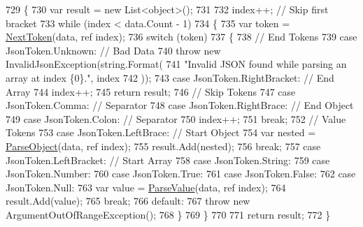 \begin{DoxyCode}
729         \{
730             var result = \textcolor{keyword}{new} List<object>();
731 
732             index++; \textcolor{comment}{// Skip first bracket}
733             \textcolor{keywordflow}{while} (index < data.Count - 1)
734             \{
735                 var token = \hyperlink{a00046_a1d2daab9b052b186da7a2b6711be5803}{NextToken}(data, ref index);
736                 \textcolor{keywordflow}{switch} (token)
737                 \{
738                     \textcolor{comment}{// End Tokens}
739                     \textcolor{keywordflow}{case} JsonToken.Unknown:             \textcolor{comment}{// Bad Data}
740                         \textcolor{keywordflow}{throw} \textcolor{keyword}{new} InvalidJsonException(\textcolor{keywordtype}{string}.Format(
741                             \textcolor{stringliteral}{"Invalid JSON found while parsing an array at index \{0\}."}, index
742                             ));
743                     \textcolor{keywordflow}{case} JsonToken.RightBracket:        \textcolor{comment}{// End Array}
744                         index++;
745                         \textcolor{keywordflow}{return} result;
746                     \textcolor{comment}{// Skip Tokens}
747                     \textcolor{keywordflow}{case} JsonToken.Comma:               \textcolor{comment}{// Separator}
748                     \textcolor{keywordflow}{case} JsonToken.RightBrace:          \textcolor{comment}{// End Object}
749                     \textcolor{keywordflow}{case} JsonToken.Colon:               \textcolor{comment}{// Separator}
750                         index++;
751                         \textcolor{keywordflow}{break};
752                     \textcolor{comment}{// Value Tokens}
753                     \textcolor{keywordflow}{case} JsonToken.LeftBrace:           \textcolor{comment}{// Start Object}
754                         var nested = \hyperlink{a00046_a49577a43cf31e147b6d46ea28f7f617e}{ParseObject}(data, ref index);
755                         result.Add(nested);
756                         \textcolor{keywordflow}{break};
757                     \textcolor{keywordflow}{case} JsonToken.LeftBracket:         \textcolor{comment}{// Start Array}
758                     \textcolor{keywordflow}{case} JsonToken.String:
759                     \textcolor{keywordflow}{case} JsonToken.Number:
760                     \textcolor{keywordflow}{case} JsonToken.True:
761                     \textcolor{keywordflow}{case} JsonToken.False:
762                     \textcolor{keywordflow}{case} JsonToken.Null:
763                         var value = \hyperlink{a00046_aa84c3b3d395c5990f202ef55321dfa1a}{ParseValue}(data, ref index);
764                         result.Add(value);
765                         \textcolor{keywordflow}{break};
766                     \textcolor{keywordflow}{default}:
767                         \textcolor{keywordflow}{throw} \textcolor{keyword}{new} ArgumentOutOfRangeException();
768                 \}
769             \}
770 
771             \textcolor{keywordflow}{return} result;
772         \}
\end{DoxyCode}
